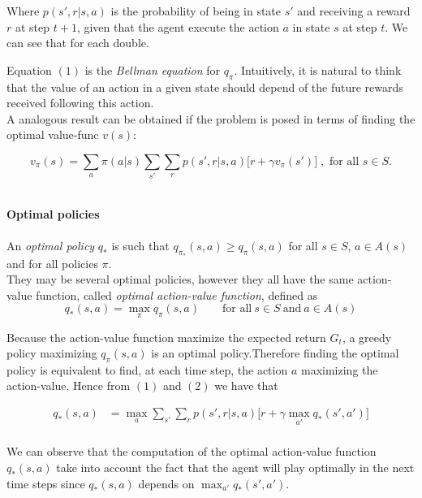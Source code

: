\documentclass[11pt, onecolumn, a4paper]{report}
\begin{document}
Where $p(s',r|s,a)$ is the probability of being in state $s'$ and receiving a reward $r$ at step $t+1$, given that the agent execute the action $a$ in state $s$ at step $t$. We can see that for each double.

Equation $(1)$ is the \textit{Bellman equation} for $q_\pi$. Intuitively, it is natural to think that the value of an action in a given state should depend of the future rewards received following this action.\\

A analogous result can be obtained if the problem is posed in terms of finding the optimal value-func $v(s)$:

$$v_\pi(s)=\sum_{a}\pi(a|s)\sum_{s'}\sum_{r}p(s',r|s,a) \Bigg [r + \gamma v_\pi(s') \Bigg ]  \; ,\text{ for all } s \in S.$$ 

\\

\textbf{Optimal policies}\\\\

An \textit{optimal policy} $q_{*}$ is  such that $q_{\pi_*}(s,a) \ge q_{\pi}(s,a)$ for all $s \in S$, $a \in A(s)$ and for all policies $\pi$. \\

They may be several optimal policies, however they all have the same action-value function, called \textit{optimal action-value function}, defined as \\

\begin{equation}
    
q_{*}(s,a) = \max_{\pi} q_{\pi}(s,a) \qquad \text{for all} \: s \in S \: \text{and} \: a \in A(s) 
\end{equation}


Because the action-value function maximize the expected return $G_t$, a greedy policy maximizing $q_{\pi}(s,a)$ is an optimal policy.Therefore finding the optimal policy is equivalent to find, at each time step, the action $a$ maximizing the action-value. Hence from $(1)$ and $(2)$ we have that

\begin{align}
q_{*}(s,a) & = \max_a\sum_{s'}\sum_{r}p(s',r|s,a) \Bigg [r + \gamma \max_{a'} q_*(s',a') \Bigg ] \nonumber \\
\end{align}

We can observe that the computation of the optimal action-value function $q_*(s,a)$ take into  account the fact that the agent will play optimally in the next time steps since $q_*(s,a)$ depends on $\max_{a'} q_*(s',a')$.\\
\end{document}
